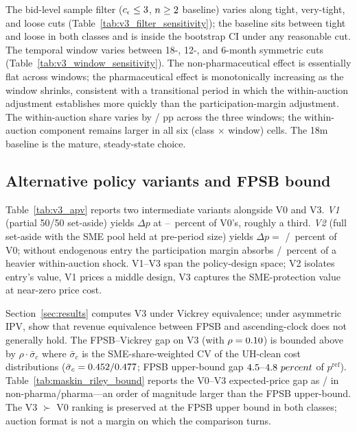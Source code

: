 The bid-level sample filter ($c_\epsilon \le 3$, $n \ge 2$ baseline) varies along tight, very-tight, and loose cuts (Table~\ref{tab:v3_filter_sensitivity}); the baseline sits between tight and loose in both classes and is inside the bootstrap CI under any reasonable cut. The temporal window varies between 18-, 12-, and 6-month symmetric cuts (Table~\ref{tab:v3_window_sensitivity}). The non-pharmaceutical effect is essentially flat across windows; the pharmaceutical effect is monotonically increasing as the window shrinks, consistent with a transitional period in which the within-auction adjustment establishes more quickly than the participation-margin adjustment. The within-auction share varies by \windowShareDriftNp/\windowShareDriftPh{} pp across the three windows; the within-auction component remains larger in all six (class $\times$ window) cells. The 18m baseline is the mature, steady-state choice.

\subsection{Alternative policy variants and FPSB bound}\label{sec:fpsb_bound}

Table~\ref{tab:v3_apv} reports two intermediate variants alongside V0 and V3. \emph{V1} (partial 50/50 set-aside) yields $\Delta p$ at \vOneGapLo--\vOneGapHi~percent of V0's, roughly a third. \emph{V2} (full set-aside with the SME pool held at pre-period size) yields $\Delta p = $ \latentShockTimesNp/\latentShockTimesPh~percent of V0; without endogenous entry the participation margin absorbs \latentShockRatioNp/\latentShockRatioPh~percent of a heavier within-auction shock. V1--V3 span the policy-design space; V2 isolates entry's value, V1 prices a middle design, V3 captures the SME-protection value at near-zero price cost.

Section~\ref{sec:results} computes V3 under Vickrey equivalence; under asymmetric IPV, \citet{maskinriley2000} show that revenue equivalence between FPSB and ascending-clock does not generally hold. The FPSB--Vickrey gap on V3 (with $\rho = 0.10$) is bounded above by $\rho \cdot \bar\sigma_c$ where $\bar\sigma_c$ is the SME-share-weighted CV of the UH-clean cost distributions ($\bar\sigma_c = 0.452/0.477$; FPSB upper-bound gap $4.5$--$4.8~percent$ of $p^{\mathrm{ref}}$). Table~\ref{tab:maskin_riley_bound} reports the V0--V3 expected-price gap as \vZeroVThreeNp/\vZeroVThreePh{} in non-pharma/pharma---an order of magnitude larger than the FPSB upper-bound. The V3 $\succ$ V0 ranking is preserved at the FPSB upper bound in both classes; auction format is not a margin on which the comparison turns.

